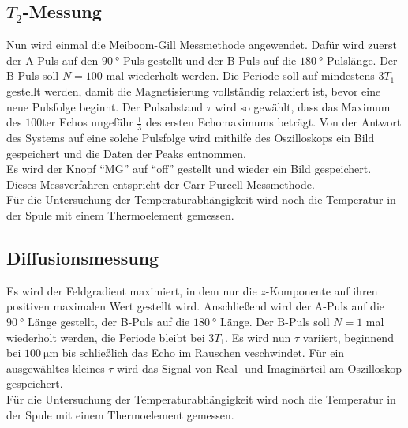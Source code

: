     \subsection{$T_2$-Messung}

        \noindent Nun wird einmal die Meiboom-Gill Messmethode angewendet. Dafür wird zuerst der A-Puls auf den $\SI{90}{\degree}$-Puls gestellt und der B-Puls auf die $\SI{180}{\degree}$-Pulslänge. Der 
        B-Puls soll $N= \num{100}$ mal wiederholt werden. Die Periode soll auf mindestens $3 T_1$ gestellt werden, damit die Magnetisierung vollständig relaxiert ist, bevor eine neue Pulsfolge beginnt. 
        Der Pulsabstand $\tau$ wird so gewählt, dass das Maximum des $\num{100}$ter Echos ungefähr $\frac{1}{3}$ des ersten Echomaximums beträgt. Von der Antwort des Systems auf eine solche Pulsfolge 
        wird mithilfe des Oszilloskops ein Bild gespeichert und die Daten der Peaks entnommen. \\ 
        Es wird der Knopf \enquote{MG} auf \enquote{off} gestellt und wieder ein Bild gespeichert. Dieses Messverfahren entspricht der Carr-Purcell-Messmethode. \\
        Für die Untersuchung der Temperaturabhängigkeit wird noch die Temperatur in der Spule mit einem Thermoelement gemessen.

    \subsection{Diffusionsmessung}

        \noindent Es wird der Feldgradient maximiert, in dem nur die $z$-Komponente auf ihren positiven maximalen Wert gestellt wird. Anschließend wird der A-Puls auf die $\SI{90}{\degree}$ Länge gestellt, 
        der B-Puls auf die $\SI{180}{\degree}$ Länge. Der B-Puls soll $N=1$ mal wiederholt werden, die Periode bleibt bei $3 T_1$. Es wird nun $\tau$ variiert, beginnend bei $\SI{100}{\micro\metre}$ 
        bis schließlich das Echo im Rauschen veschwindet. Für ein ausgewähltes kleines $\tau$ wird das Signal von Real- und Imaginärteil am Oszilloskop gespeichert. \\
        Für die Untersuchung der Temperaturabhängigkeit wird noch die Temperatur in der Spule mit einem Thermoelement gemessen.